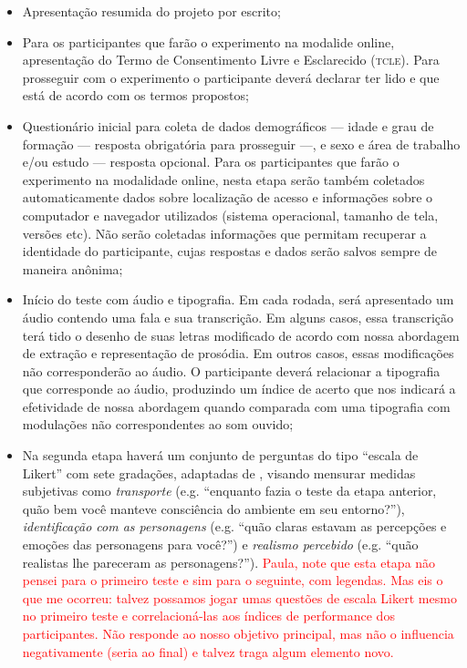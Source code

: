 \documentclass[a4paper,11pt,titlepage,singlespacing]{article}
\newcommand\todo[1]{\textcolor{red}{#1}}
\begin{document}
\begin{itemize}
    \item Apresentação resumida do projeto por escrito;
    \item Para os participantes que farão o experimento na modalide online, apresentação do Termo de Consentimento Livre e Esclarecido (\textsc{tcle}). Para prosseguir com o experimento o participante deverá declarar ter lido e que está de acordo com os termos propostos;
    \item Questionário inicial para coleta de dados demográficos — idade e grau de formação — resposta obrigatória para prosseguir —, e sexo e área de trabalho e/ou estudo — resposta opcional. Para os participantes que farão o experimento na modalidade online, nesta etapa serão também coletados automaticamente dados sobre localização de acesso e informações sobre o computador e navegador utilizados (sistema operacional, tamanho de tela, versões etc). Não serão coletadas informações que permitam recuperar a identidade do participante, cujas respostas e dados serão salvos sempre de maneira anônima; 
    \item Início do teste com áudio e tipografia. Em cada rodada, será apresentado um áudio contendo uma fala e sua transcrição. Em alguns casos, essa transcrição terá tido o desenho de suas letras modificado de acordo com nossa abordagem de extração e representação de prosódia. Em outros casos, essas modificações não corresponderão ao áudio. O participante deverá relacionar a tipografia que corresponde ao áudio, produzindo um índice de acerto que nos indicará a efetividade de nossa abordagem quando comparada com uma tipografia com modulações não correspondentes ao som ouvido;
    \item Na segunda etapa haverá um conjunto de perguntas do tipo ``escala de Likert'' com sete gradações, adaptadas de , visando mensurar medidas subjetivas como \textit{transporte} (e.g. “enquanto fazia o teste da etapa anterior, quão bem você manteve consciência do ambiente em seu entorno?”), \textit{identificação com as personagens} (e.g. “quão claras estavam as percepções e emoções das personagens para você?”) e \textit{realismo percebido} (e.g. “quão realistas lhe pareceram as personagens?”). \todo{Paula, note que esta etapa não pensei para o primeiro teste e sim para o seguinte, com legendas. Mas eis o que me ocorreu: talvez possamos jogar umas questões de escala Likert mesmo no primeiro teste e correlacioná-las aos índices de performance dos participantes. Não responde ao nosso objetivo principal, mas não o influencia negativamente (seria ao final) e talvez traga algum elemento novo.}
\end{itemize}
\end{document}
